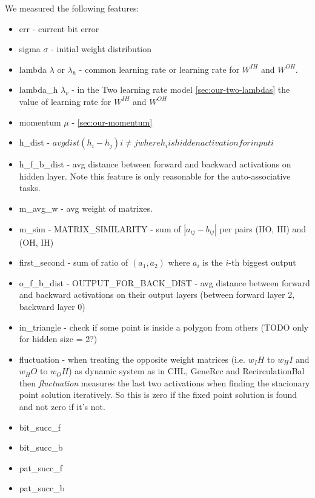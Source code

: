 We measured the following features: 
\begin{itemize} 
\item err - current bit error 
\item sigma $\sigma$ - initial weight distribution 
\item lambda $\lambda$ or $\lambda_h$ - common learning rate or learning rate for $W^{IH}$ and $W^{OH}$. 
\item lambda\_h $\lambda_v$ - in the Two learning rate model \ref{sec:our-two-lambdas} the value of learning rate for $W^{IH}$ and $W^{OH}$
\item momentum $\mu$ - \ref{sec:our-momentum}
\item h\_dist - $avg dist(h_i - h_j) i \neq j where h_i is   hidden activation for input i$
\item h\_f\_b\_dist - avg distance between forward and backward activations on hidden layer. Note this feature is only reasonable for the auto-associative tasks. 
\item m\_avg\_w - avg weight of matrixes. 
\item m\_sim - MATRIX\_SIMILARITY - sum of $|a_{ij} - b_{ij}|$ per pairs (HO, HI) and (OH, IH) 
\item first\_second - sum of ratio of $(a_1, a_2)$ where $a_i$ is the $i$-th biggest output 
\item	o\_f\_b\_dist - OUTPUT\_FOR\_BACK\_DIST - avg distance between forward and backward activations on their output layers (between forward layer 2, backward layer 0) 
\item in\_triangle - check if some point is inside a polygon from others (TODO only for hidden size = 2?)
\item fluctuation - when treating the opposite weight matrices (i.e. $w_IH$ to $w_HI$ and $w_HO$ to $w_OH$) as dynamic system as in CHL, GeneRec and RecirculationBal then \emph{fluctuation} measures the last two activations when finding the stacionary point solution iteratively. So this is zero if the fixed point solution is found and not zero if it's not. 
\item bit\_succ\_f
\item bit\_succ\_b
\item pat\_succ\_f 
\item pat\_succ\_b


\end{itemize} 

